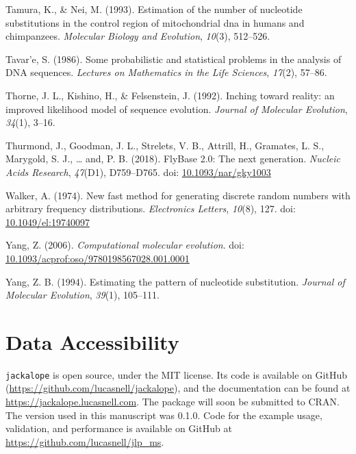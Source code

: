 \documentclass[12pt,]{article}
\begin{document}
\leavevmode\hypertarget{ref-TN93}{}%
Tamura, K., \& Nei, M. (1993). Estimation of the number of nucleotide substitutions in the control region of mitochondrial dna in humans and chimpanzees. \emph{Molecular Biology and Evolution}, \emph{10}(3), 512--526.

\leavevmode\hypertarget{ref-Tavare_1986gtr}{}%
Tavar\a'e, S. (1986). Some probabilistic and statistical problems in the analysis of DNA sequences. \emph{Lectures on Mathematics in the Life Sciences}, \emph{17}(2), 57--86.

\leavevmode\hypertarget{ref-Thorne_1992}{}%
Thorne, J. L., Kishino, H., \& Felsenstein, J. (1992). Inching toward reality: an improved likelihood model of sequence evolution. \emph{Journal of Molecular Evolution}, \emph{34}(1), 3--16.

\leavevmode\hypertarget{ref-Thurmond_2018}{}%
Thurmond, J., Goodman, J. L., Strelets, V. B., Attrill, H., Gramates, L. S., Marygold, S. J., \ldots{} and, P. B. (2018). FlyBase 2.0: The next generation. \emph{Nucleic Acids Research}, \emph{47}(D1), D759--D765. doi: \href{https://doi.org/10.1093/nar/gky1003}{10.1093/nar/gky1003}

\leavevmode\hypertarget{ref-Walker_1974}{}%
Walker, A. (1974). New fast method for generating discrete random numbers with arbitrary frequency distributions. \emph{Electronics Letters}, \emph{10}(8), 127. doi: \href{https://doi.org/10.1049/el:19740097}{10.1049/el:19740097}

\leavevmode\hypertarget{ref-Yang_2006}{}%
Yang, Z. (2006). \emph{Computational molecular evolution}. doi: \href{https://doi.org/10.1093/acprof:oso/9780198567028.001.0001}{10.1093/acprof:oso/9780198567028.001.0001}

\leavevmode\hypertarget{ref-Yang_1994}{}%
Yang, Z. B. (1994). Estimating the pattern of nucleotide substitution. \emph{Journal of Molecular Evolution}, \emph{39}(1), 105--111.


\hypertarget{data-accessibility}{%
\section{Data Accessibility}\label{data-accessibility}}

\texttt{jackalope} is open source, under the MIT license.
Its code is available on GitHub
(\url{https://github.com/lucasnell/jackalope}), and
the documentation can be found at \url{https://jackalope.lucasnell.com}.
The package will soon be submitted to CRAN.
The version used in this manuscript was 0.1.0.
Code for the example usage, validation, and performance is available on GitHub at
\url{https://github.com/lucasnell/jlp_ms}.
\end{document}
